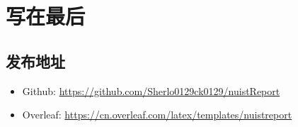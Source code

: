 \section{写在最后}
\subsection{发布地址}
\begin{itemize}
    \item Github: 
    \url{https://github.com/Sherlo0129ck0129/nuistReport}
    \item Overleaf:  
    \url{https://cn.overleaf.com/latex/templates/nuistreport}
\end{itemize}